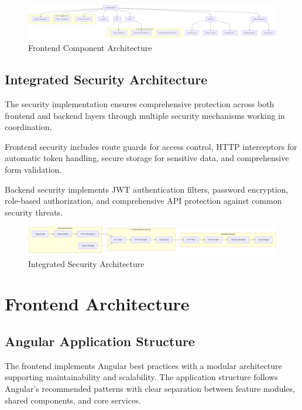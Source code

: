 \documentclass[12pt,a4paper]{article}
\begin{document}
\begin{figure}[h]
    \centering
    \includegraphics[width=1.0\textwidth]{front.png}
    \caption{Frontend Component Architecture}
\end{figure}


\subsection{Integrated Security Architecture}

The security implementation ensures comprehensive protection across both frontend and backend layers through multiple security mechanisms working in coordination.

Frontend security includes route guards for access control, HTTP interceptors for automatic token handling, secure storage for sensitive data, and comprehensive form validation.

Backend security implements JWT authentication filters, password encryption, role-based authorization, and comprehensive API protection against common security threats.

\begin{figure}[h]
    \centering
    \includegraphics[width=1.0\textwidth]{sec.png}
    \caption{Integrated Security Architecture}
\end{figure}

\section{Frontend Architecture}

\subsection{Angular Application Structure}

The frontend implements Angular best practices with a modular architecture supporting maintainability and scalability. The application structure follows Angular's recommended patterns with clear separation between feature modules, shared components, and core services.
\end{document}
